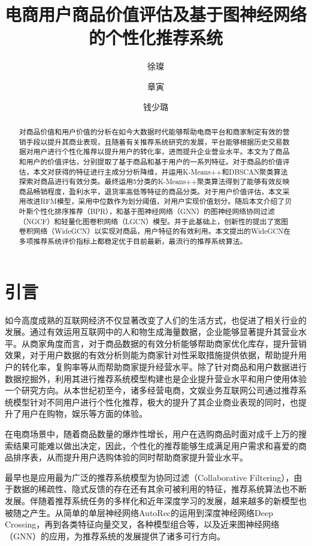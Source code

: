 \documentclass[lang=cn,11pt,a4paper,cite=authoryear]{elegantpaper}
\title{电商用户商品价值评估及基于图神经网络的个性化推荐系统}
\author{徐璨 \and 章寅 \and 钱少璐}
\institute{浙江工商大学}
\date{}
\begin{document}
\maketitle





\begin{abstract}
  对商品价值和用户价值的分析在如今大数据时代能够帮助电商平台和商家制定有效的营销手段以提升其商业表现，且随着有关推荐系统研究的发展，平台能够根据历史交易数据对用户进行个性化推荐以提升用户的转化率，进而提升企业营业水平。本文为了商品和用户的价值评估，分别提取了基于商品和基于用户的一系列特征。对于商品的价值评估，本文对获得的特征进行主成分分析降维，并运用K-Means++和DBSCAN聚类算法探索对商品进行有效分类。最终运用5分类的K-Means++聚类算法得到了能够有效反映商品畅销程度，盈利水平，退货率高低等特征的商品分类。对于用户价值评估，本文采用改进RFM模型，采用中位数作为划分阈值，对用户实现价值划分。随后本文介绍了贝叶斯个性化排序推荐（BPR），和基于图神经网络（GNN）的图神经网络协同过滤（NGCF）和轻量化图卷积网络（LGCN）模型。并于此基础上，创新性的提出了宽图卷积网络（WideGCN）以实现对商品，用户特征的有效利用。本文提出的WideGCN在多项推荐系统评价指标上都稳定优于目前最新，最流行的推荐系统算法。
\end{abstract}

\newpage
\tableofcontents

\newpage

\section{引言}
如今高度成熟的互联网经济不仅显著改变了人们的生活方式，也促进了相关行业的发展。通过有效运用互联网中的人和物生成海量数据，企业能够显著提升其营业水平。从商家角度而言，对于商品数据的有效分析能够帮助商家优化库存，提升营销效果，对于用户数据的有效分析则能为商家针对性采取措施提供依据，帮助提升用户的转化率，复购率等从而帮助商家提升经营水平。除了针对商品和用户数据进行数据挖掘外，利用其进行推荐系统模型构建也是企业提升营业水平和用户使用体验一个研究方向。从本世纪初至今，诸多经营电商，文娱业务互联网公司通过推荐系统模型针对不同用户进行个性化推荐，极大的提升了其企业商业表现的同时，也提升了用户在购物，娱乐等方面的体验。

在电商场景中，随着商品数量的爆炸性增长，用户在选购商品时面对成千上万的搜索结果可能难以做出决定，因此，个性化的推荐能够生成满足用户需求和喜爱的商品排序表，从而提升用户选购体验的同时帮助商家提升营业水平。

最早也是应用最为广泛的推荐系统模型为协同过滤（Collaborative Filtering），由于数据的稀疏性、隐式反馈的存在还有其余可被利用的特征，推荐系统算法也不断发展。伴随着推荐系统任务的多样化和近年深度学习的发展，越来越多的新模型也被随之产生。从简单的单层神经网络AutoRec\cite{sedhain_autorec_2015}的运用到深度神经网络Deep Crossing\cite{shan_deep_2016}，再到各类特征向量交叉，各种模型组合等，以及近来图神经网络（GNN）的应用\cite{wu_session-based_2019}，为推荐系统的发展提供了诸多可行方向。
\end{document}
